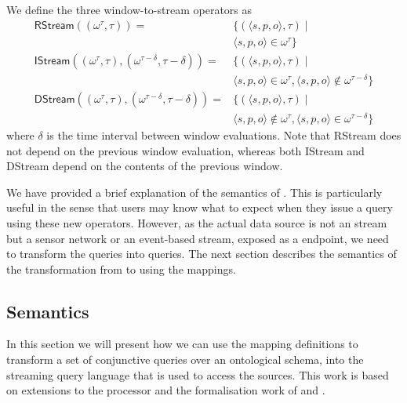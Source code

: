 We define the three window-to-stream operators as
\begin{align*}
  \textsf{RStream}(
		{\scriptstyle (\omega^\tau, \tau)}) 
		=& \{(\langle s, p, o \rangle, \tau) \mid \\
	 	 & \langle s, p, o \rangle \in \omega^\tau\}\\
%
  \textsf{IStream}(
		{\scriptstyle (\omega^\tau, \tau), (\omega^{\tau-\delta}, \tau - \delta)}) 
		=& \{(\langle s, p, o \rangle, \tau) \mid \\
		& \langle s, p, o \rangle \in \omega^\tau, \langle s, p, o \rangle \notin \omega^{\tau-\delta}\}\\
%
  \textsf{DStream}(
		{\scriptstyle (\omega^\tau, \tau), (\omega^{\tau-\delta}, \tau - \delta)})
		=& \{(\langle s, p, o \rangle, \tau) \mid \\
		& \langle s, p, o \rangle \notin \omega^\tau, \langle s, p, o \rangle \in \omega^{\tau-\delta}\}
\end{align*}
where $\delta$ is the time interval between window evaluations.
Note that \textsf{RStream} does not depend on the previous window evaluation, whereas both \textsf{IStream} and \textsf{DStream} depend on the contents of the previous window.

We have provided a brief explanation of the semantics of \sparqlstr. 
This is particularly useful in the sense that users may know what to expect when they issue a query using these new operators. 
However, as the actual data source is not an \rdf stream but a sensor network or an event-based stream, \eg exposed as a \sneeql endpoint, we need to transform the \sparqlstr queries into \sneeql queries.
The next section describes the semantics of the transformation from \sparqlstr to \sneeql using the \stwoo mappings.


\subsection{\bigstwoo Semantics}
\label{mappingsemantics}

In this section we will present how we can use the \stwoo mapping definitions to transform a set of conjunctive queries over an ontological schema, into the streaming query language \sneeql that is used to access the sources. 
This work is based on extensions to the \odemapster processor \cite{Barrasa_04} and the
formalisation work of \citet{Calvanese_05} and \citet{Poggi_08}.

